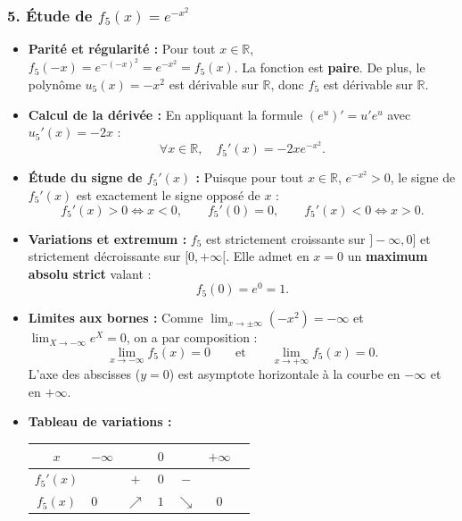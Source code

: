 \documentclass[11pt,a4paper]{article}
\newcommand{\R}{\mathbb{R}}
\begin{document}
\begin{correctionbox}[Exercice 3]
\subsubsection*{5. Étude de $f_5(x) = e^{-x^2}$}
\begin{itemize}
    \item \textbf{Parité et régularité :}
    Pour tout $x \in \R$, $f_5(-x) = e^{-(-x)^2} = e^{-x^2} = f_5(x)$. La fonction est \textbf{paire}.
    De plus, le polynôme $u_5(x) = -x^2$ est dérivable sur $\R$, donc $f_5$ est dérivable sur $\R$.
    \item \textbf{Calcul de la dérivée :}
    En appliquant la formule $(e^u)' = u' e^u$ avec $u_5'(x) = -2x$ :
    \[
    \forall x \in \R, \quad f_5'(x) = -2x e^{-x^2}.
    \]
    \item \textbf{Étude du signe de $f_5'(x)$ :}
    Puisque pour tout $x \in \R$, $e^{-x^2} > 0$, le signe de $f_5'(x)$ est exactement le signe opposé de $x$ :
    \[
    f_5'(x) > 0 \iff x < 0, \qquad f_5'(0) = 0, \qquad f_5'(x) < 0 \iff x > 0.
    \]
    \item \textbf{Variations et extremum :}
    $f_5$ est strictement croissante sur $]-\infty, 0]$ et strictement décroissante sur $[0, +\infty[$.
    Elle admet en $x = 0$ un \textbf{maximum absolu strict} valant :
    \[
    f_5(0) = e^0 = 1.
    \]
    \item \textbf{Limites aux bornes :}
    Comme $\lim_{x \to \pm\infty} (-x^2) = -\infty$ et $\lim_{X \to -\infty} e^X = 0$, on a par composition :
    \[
    \lim_{x \to -\infty} f_5(x) = 0 \qquad \text{et} \qquad \lim_{x \to +\infty} f_5(x) = 0.
    \]
    L'axe des abscisses ($y = 0$) est asymptote horizontale à la courbe en $-\infty$ et en $+\infty$.
    \item \textbf{Tableau de variations :}
    \begin{center}
    \begin{tabular}{|c|lccccr|}
    \hline
    $x$ & $-\infty$ & & $0$ & & $+\infty$ \\
    \hline
    $f_5'(x)$ & & $+$ & $0$ & $-$ & \\
    \hline
    $f_5(x)$ & $0$ & $\nearrow$ & $1$ & $\searrow$ & $0$ \\
    \hline
    \end{tabular}
    \end{center}
\end{itemize}


\end{correctionbox}
\end{document}
